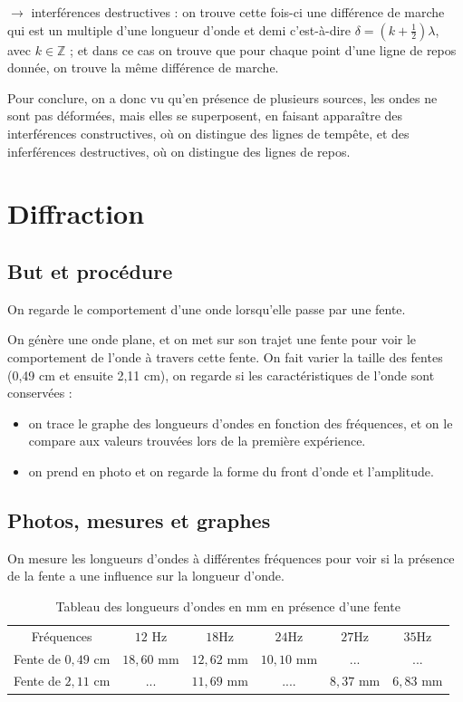 \documentclass{report}
\begin{document}
$\rightarrow$ interférences destructives : on trouve cette fois-ci une différence de marche qui est un multiple d'une longueur d'onde et demi c'est-à-dire $\delta = ( k + \frac{1}{2})\lambda$, avec $k \in \mathbb{Z}$ ; et dans ce cas on trouve que pour chaque point d'une ligne de repos donnée, on trouve la même différence de marche.
\newline

Pour conclure, on a donc vu qu'en présence de plusieurs sources, les ondes ne sont pas déformées, mais elles se superposent, en faisant apparaître des interférences constructives, où on distingue des lignes de tempête, et des inferférences destructives, où on distingue des lignes de repos.


\section{Diffraction}

\subsection{But et procédure}
On regarde le comportement d'une onde lorsqu'elle passe par une fente.

On génère une onde plane, et on met sur son trajet une fente pour voir le comportement de l'onde à travers cette fente.
On fait varier la taille des fentes (0,49 cm et ensuite 2,11 cm), on regarde si les caractéristiques de l'onde sont conservées :
\begin{itemize}[label=]
    \item on trace le graphe des longueurs d'ondes en fonction des fréquences, et on le compare aux valeurs trouvées lors de la première expérience.
    \item on prend en photo et on regarde la forme du front d'onde et l'amplitude.
\end{itemize}

\subsection{Photos, mesures et graphes}

On mesure les longueurs d'ondes à différentes fréquences pour voir si la présence de la fente a une influence sur la longueur d'onde.

\begin{table}[h]
\centering
\caption{Tableau des longueurs d'ondes en mm en présence d'une fente}
\label{tab:freq}
\begin{tabular}{c|c|c|c|c|c}
Fréquences  & $12$ Hz & $18$Hz & $24$Hz & $27$Hz & $35$Hz \\
Fente de $0,49$ cm & $18,60$ mm & $12,62$ mm & $10,10$ mm & ... & ... \\
Fente de $2,11$ cm & ... & $11,69$ mm & .... & $8,37$ mm & $6,83$ mm \\
\end{tabular}
\end{table}
\end{document}
